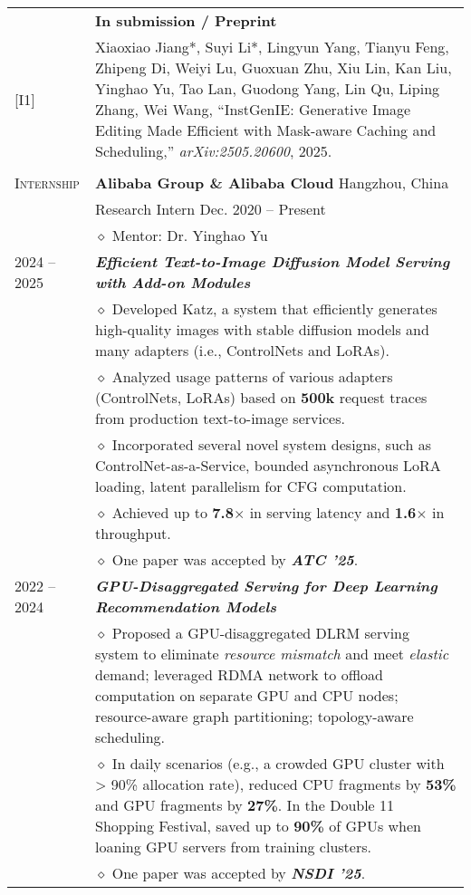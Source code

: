 \documentclass[letterpaper, 12pt]{article}
\begin{document}
\begin{longtable}{p{1.0in}p{5.8in}}
& \textbf{In submission / Preprint} \\
\hfill [I1]
& Xiaoxiao Jiang*, Suyi Li*, Lingyun Yang, Tianyu Feng, Zhipeng Di, Weiyi Lu, Guoxuan Zhu, Xiu Lin, Kan Liu, Yinghao Yu, Tao Lan, Guodong Yang, Lin Qu, Liping Zhang, Wei Wang, “InstGenIE: Generative Image Editing Made Efficient with Mask-aware Caching and Scheduling,” \textit{arXiv:2505.20600}, 2025. \\

& \\


\nohyphens{\textsc{Internship}}
& \textbf{Alibaba Group \& Alibaba Cloud} \hfill Hangzhou, China \\
& Research Intern \hfill Dec. 2020 -- Present \\
& $\diamond$ Mentor: Dr. Yinghao Yu \\

2024 -- 2025
& \textbf{\emph{Efficient Text-to-Image Diffusion Model Serving with Add-on Modules}} \\
    & $\diamond$ Developed Katz, a system that efficiently generates high-quality images with stable diffusion models and many adapters (i.e., ControlNets and LoRAs). \\
    & $\diamond$ Analyzed usage patterns of various adapters (ControlNets, LoRAs) based on \textbf{500k} request traces from production text-to-image services. \\
    & $\diamond$ Incorporated several novel system designs, such as ControlNet-as-a-Service, bounded asynchronous LoRA loading, latent parallelism for CFG computation. \\
    & $\diamond$ Achieved up to \textbf{7.8$\times$} in serving latency and \textbf{1.6$\times$} in throughput. \\
    & $\diamond$ One paper was accepted by \textbf{\emph{ATC '25}}. \\

2022 -- 2024
& \textbf{\emph{GPU-Disaggregated Serving for Deep Learning Recommendation Models}} \\
    & $\diamond$ Proposed a GPU-disaggregated DLRM serving system to eliminate \textit{resource mismatch} and meet \textit{elastic} demand; leveraged RDMA network to offload computation on separate GPU and CPU nodes; resource-aware graph partitioning; topology-aware scheduling. \\
    & $\diamond$ In daily scenarios (e.g., a crowded GPU cluster with > 90\% allocation rate), reduced CPU fragments by \textbf{53\%} and GPU fragments by \textbf{27\%}. In the Double 11 Shopping Festival, saved up to \textbf{90\%} of GPUs when loaning GPU servers from training clusters. \\
    & $\diamond$ One paper was accepted by \textbf{\emph{NSDI '25}}. \\


\end{longtable}
\end{document}
